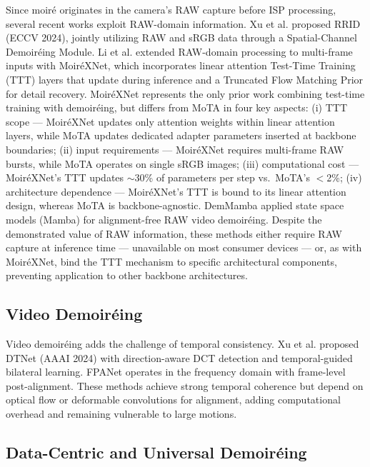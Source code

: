 \documentclass[10pt,twocolumn,letterpaper]{article}
\begin{document}
Since moir\'{e} originates in the camera's RAW capture before ISP processing, several recent works exploit RAW-domain information. Xu et al. \cite{xu2024image} proposed RRID (ECCV 2024), jointly utilizing RAW and sRGB data through a Spatial-Channel Demoir\'{e}ing Module. Li et al. \cite{li2025moirexnet} extended RAW-domain processing to multi-frame inputs with Moir\'{e}XNet, which incorporates linear attention Test-Time Training (TTT) layers that update during inference and a Truncated Flow Matching Prior for detail recovery. Moir\'{e}XNet represents the only prior work combining test-time training with demoir\'{e}ing, but differs from MoTA in four key aspects: (i) TTT scope --- Moir\'{e}XNet updates only attention weights within linear attention layers, while MoTA updates dedicated adapter parameters inserted at backbone boundaries; (ii) input requirements --- Moir\'{e}XNet requires multi-frame RAW bursts, while MoTA operates on single sRGB images; (iii) computational cost --- Moir\'{e}XNet's TTT updates $\sim$30\% of parameters per step vs.\ MoTA's $<$2\%; (iv) architecture dependence --- Moir\'{e}XNet's TTT is bound to its linear attention design, whereas MoTA is backbone-agnostic. DemMamba \cite{xu2024demmamba} applied state space models (Mamba) for alignment-free RAW video demoir\'{e}ing. Despite the demonstrated value of RAW information, these methods either require RAW capture at inference time --- unavailable on most consumer devices --- or, as with Moir\'{e}XNet, bind the TTT mechanism to specific architectural components, preventing application to other backbone architectures.

\subsection{Video Demoir\'{e}ing}

Video demoir\'{e}ing adds the challenge of temporal consistency. Xu et al. \cite{xu2024direction} proposed DTNet (AAAI 2024) with direction-aware DCT detection and temporal-guided bilateral learning. FPANet \cite{anonymous2025fpanet} operates in the frequency domain with frame-level post-alignment. These methods achieve strong temporal coherence but depend on optical flow or deformable convolutions for alignment, adding computational overhead and remaining vulnerable to large motions.

\subsection{Data-Centric and Universal Demoir\'{e}ing}
\end{document}
